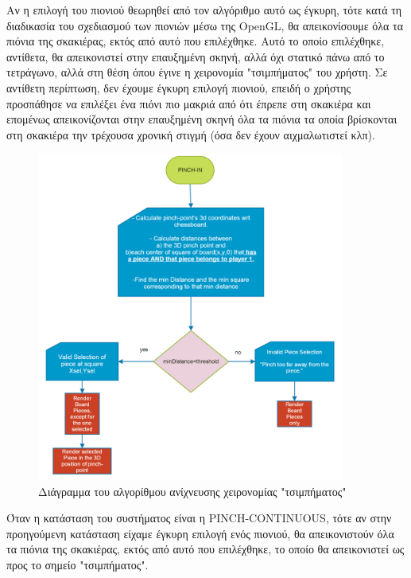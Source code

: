 Αν η επιλογή του πιονιού θεωρηθεί από τον αλγόριθμο αυτό ως έγκυρη, τότε κατά τη διαδικασία του σχεδιασμού των πιονιών μέσω της OpenGL, θα απεικονίσουμε όλα τα πιόνια της σκακιέρας, εκτός από αυτό που επιλέχθηκε. Αυτό το οποίο επιλέχθηκε, αντίθετα, θα απεικονιστεί στην επαυξημένη σκηνή, αλλά όχι στατικό πάνω από το τετράγωνο, αλλά στη θέση όπου έγινε η χειρονομία "τσιμπήματος" του χρήστη. Σε αντίθετη περίπτωση, δεν έχουμε έγκυρη επιλογή πιονιού, επειδή ο χρήστης προσπάθησε να επιλέξει ένα πιόνι πιο μακριά από ότι έπρεπε στη σκακιέρα και επομένως απεικονίζονται στην επαυξημένη σκηνή όλα τα πιόνια τα οποία βρίσκονται στη σκακιέρα την τρέχουσα χρονική στιγμή (όσα δεν έχουν αιχμαλωτιστεί κλπ).




\begin{figure}[H]
    \centering
    \includegraphics[width=0.9\textwidth]{Files/Figures/pinch_in.png}
    \caption[Διάγραμμα του αλγορίθμου ανίχνευσης χειρονομίας "τσιμπήματος"]{Διάγραμμα του αλγορίθμου ανίχνευσης χειρονομίας "τσιμπήματος"}
    \label{fig:gesture_rec}
\end{figure}


Όταν η κατάσταση του συστήματος είναι η PINCH-CONTINUOUS, τότε αν στην προηγούμενη κατάσταση είχαμε έγκυρη επιλογή ενός πιονιού, θα απεικονιστούν όλα τα πιόνια της σκακιέρας, εκτός από αυτό που επιλέχθηκε, το οποίο θα απεικονιστεί ως προς το σημείο "τσιμπήματος". 

